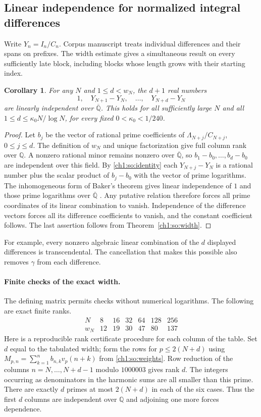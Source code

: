 \documentclass[11pt,a4paper,oneside,openany]{report}
\newtheorem{corollary}[theorem]{Corollary}
\theoremstyle{remark}\newtheorem{remark}[theorem]{Remark}
\numberwithin{equation}{section}
\begin{document}
\subsection{Linear independence for normalized integral differences}
Write $Y_n=I_n/C_n$. Corpus manuscript \cite{vm170} treats individual differences and their spans on prefixes. The width estimate gives a simultaneous result on every sufficiently late block, including blocks whose length grows with their starting index.

\begin{corollary}\label{ch1:so:chords}
For any $N$ and $1\le d<w_N$, the $d+1$ real numbers
\[
 1,\quad Y_{N+1}-Y_N,\quad \ldots,\quad Y_{N+d}-Y_N
\]
are linearly independent over $\overline{\mathbb Q}$. This holds for all sufficiently large $N$ and all $1\le d\le \kappa_0 N/\log N$, for every fixed $0<\kappa_0<1/240$.
\end{corollary}
\begin{proof}
Let $b_j$ be the vector of rational prime coefficients of $\Lambda_{N+j}/C_{N+j}$, $0\le j\le d$. The definition of $w_N$ and unique factorization give full column rank over $\mathbb Q$. A nonzero rational minor remains nonzero over $\overline{\mathbb Q}$, so $b_1-b_0,\ldots,b_d-b_0$ are independent over this field.
By \eqref{ch1:so:identity} each $Y_{N+j}-Y_N$ is a rational number plus the scalar product of $b_j-b_0$ with the vector of prime logarithms. The inhomogeneous form of Baker's theorem gives linear independence of $1$ and those prime logarithms over $\overline{\mathbb Q}$ \cite{baker}. Any putative relation therefore forces all prime coordinates of its linear combination to vanish. Independence of the difference vectors forces all its difference coefficients to vanish, and the constant coefficient follows. The last assertion follows from Theorem~\ref{ch1:so:width}.
\end{proof}
For example, every nonzero algebraic linear combination of the $d$ displayed differences is transcendental. The cancellation that makes this possible also removes $\gamma$ from each difference.

\paragraph{Finite checks of the exact width.}
The defining matrix permits checks without numerical logarithms. The following are exact finite ranks.
\[
\begin{array}{c|rrrrrr}
 N&8&16&32&64&128&256\\ \hline
 w_N&12&19&30&47&80&137
\end{array}
\]
Here is a reproducible rank certificate procedure for each column of the table. Set $d$ equal to the tabulated width; form the rows for $p\le2(N+d)$ using
$M_{p,n}=\sum_{k=1}^n b_{n,k}v_p(n+k)$ from \eqref{ch1:so:weights}. Row reduction of the columns $n=N,\ldots,N+d-1$ modulo $1000003$ gives rank $d$. The integers occurring as denominators in the harmonic sums are all smaller than this prime. There are exactly $d$ primes at most $2(N+d)$ in each of the six cases. Thus the first $d$ columns are independent over $\mathbb Q$ and adjoining one more forces dependence.
\end{document}
